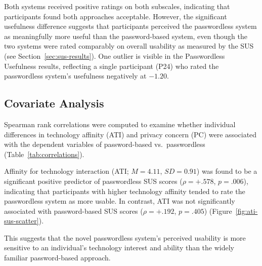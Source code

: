 

Both systems received positive ratings on both subscales, indicating that participants found both approaches acceptable. However, the significant usefulness difference suggests that participants perceived the passwordless system as meaningfully more useful than the password-based system, even though the two systems were rated comparably on overall usability as measured by the SUS (see Section~\ref{sec:sus-results}). One outlier is visible in the Passwordless Usefulness results, reflecting a single participant (P24) who rated the passwordless system's usefulness negatively at $-1.20$.


\subsection{Covariate Analysis}
\label{sec:covariate-analysis}

Spearman rank correlations were computed to examine whether individual differences in technology affinity (ATI) and privacy concern (PC) were associated with the dependent variables of password-based vs.\ passwordless (Table~\ref{tab:correlations}).

Affinity for technology interaction (ATI; $M = 4.11$, $SD = 0.91$) was found to be a significant positive predictor of passwordless SUS scores ($\rho=+.578$, $p=.006$), indicating that participants with higher technology affinity tended to rate the passwordless system as more usable. In contrast, ATI was not significantly associated with password-based SUS scores ($\rho=+.192$, $p=.405$) (Figure~\ref{fig:ati-sus-scatter}).



This suggests that the novel passwordless system's perceived usability is more sensitive to an individual's technology interest and ability than the widely familiar password-based approach.

